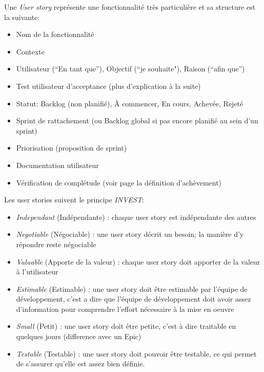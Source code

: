 Une \emph{User story} représente une fonctionnalité très particulière et sa structure est la suivante:

\begin{itemize}
      \item Nom de la fonctionnalité
      \item Contexte
      \item Utilisateur (“En tant que”), Objectif (“je souhaite"), Raison (“afin que”)
      \item Test utilisateur d’acceptance (plus d’explication à la suite)
      \item Statut: Backlog (non planifié), À commencer, En cours, Achevée, Rejeté
      \item Sprint de rattachement (ou Backlog global si pas encore planifié au sein d’un sprint)
      \item Priorisation (proposition de sprint)
      \item Documentation utilisateur
      \item Vérification de complétude (voir page \pageref{DefofDoneUS} la définition d'achèvement)
\end{itemize}

\bigskip

Les user stories suivent le principe \emph{INVEST}:
\begin{itemize}
      \item \emph{Independant} (Indépendante) : chaque user story est indépendante des autres
      \item \emph{Negotiable} (Négociable) : une user story décrit un besoin; la manière d’y répondre reste 
      négociable
      \item \emph{Valuable} (Apporte de la valeur) : chaque user story doit apporter de la valeur à l'utilisateur
      \item \emph{Estimable} (Estimable) : une user story doit être estimable par l'équipe de développement, 
      c’est a dire que l'équipe de développement doit avoir assez d’information pour comprendre l’effort nécessaire à la mise en oeuvre
      \item \emph{Small} (Petit) : une user story doit être petite, c’est à dire traitable en quelques jours 
      (difference avec un Epic)
      \item \emph{Testable} (Testable) : une user story doit pouvoir être testable, ce qui permet de s’assurer 
      qu’elle est assez bien définie. 
\end{itemize}

